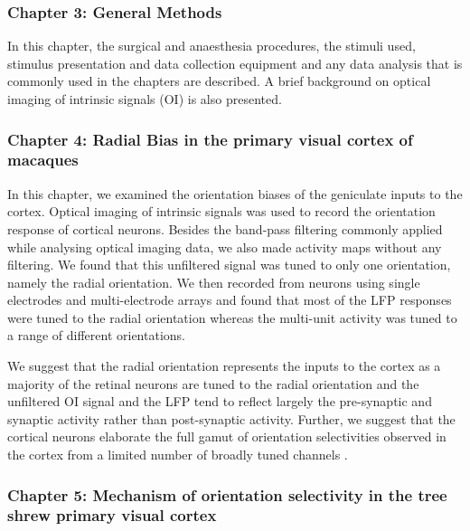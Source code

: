 \subsubsection{Chapter 3: General Methods}

In this chapter, the surgical and anaesthesia procedures, the stimuli
used, stimulus presentation and data collection equipment and any data
analysis that is commonly used in the chapters are described. A brief
background on optical imaging of intrinsic signals (OI) is also
presented.


\subsubsection{Chapter 4: Radial Bias in the primary visual cortex of macaques}

In this chapter, we examined the orientation biases of the geniculate
inputs to the cortex. Optical imaging of intrinsic signals was used to
record the orientation response of cortical neurons. Besides the
band-pass filtering commonly applied while analysing optical imaging
data, we also made activity maps without any filtering. We found that
this unfiltered signal was tuned to only one orientation, namely the
radial orientation. We then recorded from neurons using single
electrodes and multi-electrode arrays and found that most of the LFP
responses were tuned to the radial orientation whereas the multi-unit
activity was tuned to a range of different orientations.

We suggest that the radial orientation represents the inputs to the
cortex as a majority of the retinal neurons are tuned to the radial
orientation and the unfiltered OI signal and the LFP tend to reflect
largely the pre-synaptic and synaptic activity rather than post-synaptic
activity. Further, we suggest that the cortical neurons elaborate the
full gamut of orientation selectivities observed in the cortex from a
limited number of broadly tuned channels \cite{Vidyasagar2015}.

\subsubsection{Chapter 5: Mechanism of orientation selectivity in the tree shrew primary visual cortex}

